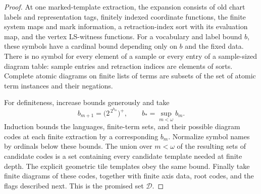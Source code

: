 \begin{proof}
At one marked-template extraction, the expansion consists of old chart
labels and representation tags, finitely indexed coordinate functions,
the finite system maps and mark information, a retraction-index sort
with its evaluation map, and the vertex LS-witness functions.  For a
vocabulary and label bound $b$, these symbols have a cardinal bound
depending only on $b$ and the fixed data.  There is no symbol for every
element of a sample or every entry of a sample-sized diagram table:
sample entries and retraction indices are elements of sorts.  Complete
atomic diagrams on finite lists of terms are subsets of the set of
atomic term instances and their negations.

For definiteness, increase bounds generously and take
\[
 b_{m+1}=\bigl(2^{\,2^{b_m}}\bigr)^+,
 \qquad b_* =\sup_{m<\omega}b_m.
\]
Induction bounds the languages, finite-term sets, and their possible
diagram codes at each finite extraction by a corresponding $b_m$.
Normalize symbol names by ordinals below these bounds.  The union over
$m<\omega$ of the resulting sets of candidate codes is a set containing
every candidate template needed at finite depth.  The explicit geometric
tile templates obey the same bound.  Finally take finite diagrams of
these codes, together with finite axis data, root codes, and the flags
described next.  This is the promised set $\mathcal D$.


\end{proof}
